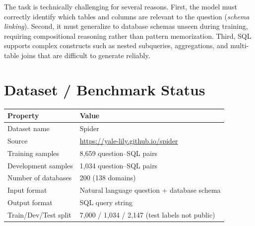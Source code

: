 \documentclass[11pt,a4paper]{article}
\begin{document}
The task is technically challenging for several reasons.
First, the model must correctly identify which tables and columns are relevant
to the question (\textit{schema linking}).
Second, it must generalize to database schemas unseen during training,
requiring compositional reasoning rather than pattern memorization.
Third, SQL supports complex constructs such as nested subqueries, aggregations,
and multi-table joins that are difficult to generate reliably.



\section{Dataset / Benchmark Status}


\begin{center}
\begin{tabular}{ll}
  \toprule
  \textbf{Property} & \textbf{Value} \\
  \midrule
  Dataset name      & Spider \\
  Source            & \url{https://yale-lily.github.io/spider} \\
  Training samples  & 8,659 question–SQL pairs \\
  Development samples & 1,034 question–SQL pairs \\
  Number of databases & 200 (138 domains) \\
  Input format      & Natural language question + database schema \\
  Output format     & SQL query string \\
  Train/Dev/Test split & 7,000 / 1,034 / 2,147 (test labels not public) \\
  \bottomrule
\end{tabular}
\end{center}
\end{document}
